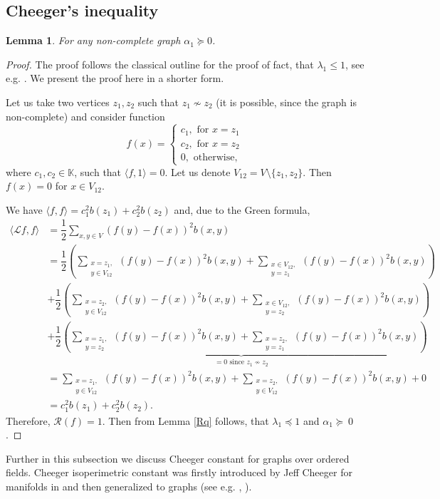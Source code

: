 \documentclass[a4paper,12pt]{amsart}
\newtheorem{lemma}{Lemma}
\theoremstyle{definition}
\newcommand{\K}{\mathbb{K}}
\newcommand{\R}{\mathcal{R}}
\newcommand{\weight}{b}
\begin{document}
\subsection{Cheeger's inequality}
\begin{lemma}\label{lemma::non-complete}
For any non-complete graph $\alpha_1\succeq 0$.
\end{lemma}
\begin{proof}
The proof follows the classical outline for the proof of fact, that $\lambda_1\le 1$, see e.g. \cite[p.44]{Grigoryan}. We present the proof here in a shorter form.

Let us take two vertices $z_1,z_2$ such that $z_1\not\sim z_2$ (it is possible, since the graph is non-complete) and consider  function
\begin{equation*}
f(x) = 
\begin{cases}
c_1, \mbox{ for } x = z_1\\
c_2, \mbox{ for } x = z_2\\
0, \mbox{ otherwise},
\end{cases}
\end{equation*}
where $c_1, c_2\in \K$, such that $\langle f,1\rangle=0$. Let us denote $V_{12}=V\setminus\{z_1,z_2\}$. Then $f(x)=0$ for $x\in V_{12}$.

We have $\langle f, f\rangle=c_1^2\weight (z_1)+c_2^2\weight(z_2)$ and, due to the Green formula,
\begin{align*}
\langle \mathcal L f,f\rangle&=\dfrac{1}{2}\sum_{x,y\in V}(f(y)-f(x))^2 \weight (x,y)\\
&=\dfrac{1}{2}\left(\sum_{\substack{x=z_1,\\ y\in V_{12}}}(f(y)-f(x))^2 \weight (x,y)+\sum_{\substack{x\in V_{12},\\y=z_1}}(f(y)-f(x))^2 \weight (x,y)\right)\\
&+\dfrac{1}{2}\left(\sum_{\substack{x=z_2, \\y\in V_{12}}}(f(y)-f(x))^2 \weight (x,y)+\sum_{\substack{x\in V_{12},\\y=z_2}}(f(y)-f(x))^2 \weight (x,y)\right)\\
&+\underbrace{\dfrac{1}{2}\left(\sum_{\substack{x=z_1,\\y=z_2}}(f(y)-f(x))^2 \weight (x,y)+\sum_{\substack{x=z_2,\\y=z_1}}(f(y)-f(x))^2 \weight (x,y)\right)}_{=0 \mbox{ since }z_1\not\sim z_2}\\
&=\sum_{\substack{x=z_1,\\y\in V_{12}}}(f(y)-f(x))^2 \weight (x,y)+\sum_{\substack{x=z_2,\\y\in V_{12}}}(f(y)-f(x))^2 \weight (x,y)+0\\
&=c_1^2\weight (z_1)+c_2^2\weight (z_2).
\end{align*}
Therefore, $\R(f)=1$. Then  from Lemma \ref{Rq} follows, that $\lambda_1\preceq 1$ and $\alpha_1\succeq~0$.
\end{proof}
Further in this subsection we discuss Cheeger constant for graphs over ordered fields. Cheeger isoperimetric constant was firstly introduced by Jeff Cheeger for manifolds in \cite{Cheeger} and then generalized to graphs (see e.g. \cite{BauerJost}, \cite{Chung}).
\end{document}
